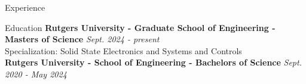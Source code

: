 \documentclass{resume}
\begin{document}
\begin{rSection}{Experience}
    \end{rSection}


    \vspace{-2mm}
    \begin{rSection}{Education}
        {\bf  Rutgers University - Graduate School of Engineering - Masters of Science} \hfill {\em Sept. 2024 - present} \\
        Specialization: Solid State Electronics and Systems and Controls \\
        {\bf Rutgers University - School of Engineering - Bachelors of Science} \hfill {\em Sept. 2020 - May 2024} \\

    \end{rSection}
    \vspace{-2mm}
\end{document}
